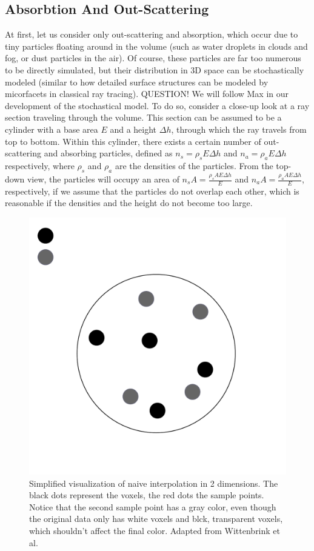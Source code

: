 \subsection{Absorbtion And Out-Scattering}
At first, let us consider only out-scattering and absorption, which occur due to tiny particles floating around in the volume (such as water droplets in clouds and fog, or dust particles in the air).
Of course, these particles are far too numerous to be directly simulated, but their distribution in 3D space can be stochastically modeled (similar to how detailed surface structures can be modeled by micorfacets in classical ray tracing).
QUESTION!
We will follow Max\cite{468400} in our development of the stochastical model.
To do so, consider a close-up look at a ray section traveling through the volume.
This section can be assumed to be a cylinder with a base area $E$ and a height $\Delta h$, through which the ray travels from top to bottom.
Within this cylinder, there exists a certain number of out-scattering and absorbing particles, defined as $n_s={\rho}_sE{\Delta}h$ and $n_a={\rho}_aE{\Delta}h$ respectively, where ${\rho}_s$ and ${\rho}_a$ are the densities of the particles.
From the top-down view, the particles will occupy an area of ${n_sA}=\frac{{\rho}_sAE{\Delta}h}{E}$ and ${n_aA}=\frac{{\rho}_aAE{\Delta}h}{E}$, respectively, if we assume that the particles do not overlap each other, which is reasonable if the densities and the height do not become too large.
 \begin{figure}[htb]
  \centering
  \includegraphics[width=.8\linewidth]{figure_3}
  \parbox[t]{.9\columnwidth}{\relax}
  \caption{\label{fig:projected_cylinder}
          Simplified visualization of naive interpolation in 2 dimensions. The black dots represent the voxels, the red dots the sample points. Notice that the second sample point has a gray color, even though the original data only has white voxels and blck, transparent voxels, which shouldn't affect the final color. Adapted from Wittenbrink et al.\cite{729595}}
\end{figure}
